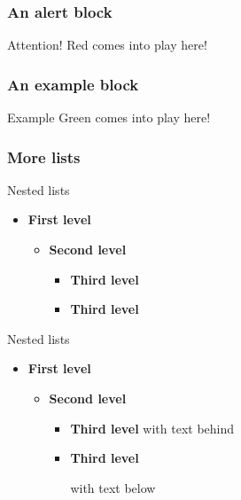 \documentclass[english]{beamer}
\begin{document}
\begin{frame}
	\frametitle{An alert block}

	\begin{alertblock}{Attention!}
		Red comes into play here!
	\end{alertblock}
\end{frame}

\begin{frame}
	\frametitle{An example block}

	\begin{exampleblock}{Example}
		Green comes into play here!
	\end{exampleblock}
\end{frame}

\begin{frame}
	\frametitle{More lists}

	Nested lists
	\begin{itemize}
		\item \textbf{First level}
		\begin{itemize}
			\item \textbf{Second level}
			\begin{itemize}
				\item \textbf{Third level}
				\item \textbf{Third level}
			\end{itemize}
		\end{itemize}
	\end{itemize}
	Nested lists
	\begin{itemize}
		\item \textbf{First level}
		\begin{itemize}
			\item \textbf{Second level}
			\begin{itemize}
				\item \textbf{Third level} with text behind
				\item \textbf{Third level}

				with text below
			\end{itemize}
		\end{itemize}
	\end{itemize}
\end{frame}
\end{document}
